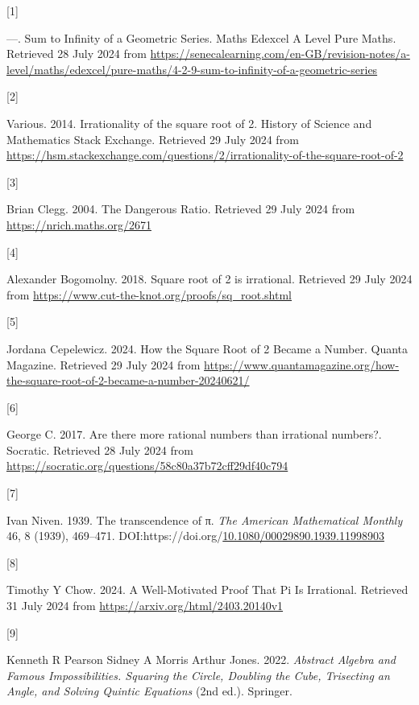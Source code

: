 \documentclass[
  a4paper,
]{article}
\newlength{\cslhangindent}
\newlength{\csllabelwidth}
\newenvironment{CSLReferences}[2] %
 {\begin{list}{}{%
  \setlength{\itemindent}{0pt}
  \setlength{\leftmargin}{0pt}
  \setlength{\parsep}{0pt}
  \ifodd #1
   \setlength{\leftmargin}{\cslhangindent}
   \setlength{\itemindent}{-1\cslhangindent}
  \fi
  \setlength{\itemsep}{#2\baselineskip}}}
 {\end{list}}
\newcommand{\CSLLeftMargin}[1]{\parbox[t]{\csllabelwidth}{\strut#1\strut}}
\newcommand{\CSLRightInline}[1]{\parbox[t]{\linewidth - \csllabelwidth}{\strut#1\strut}}
\begin{document}
\label{refs}
\begin{CSLReferences}{0}{0}
\CSLLeftMargin{{[}1{]} }%
\CSLRightInline{---. {Sum to Infinity of a Geometric Series}. {Maths
Edexcel A Level Pure Maths}. Retrieved 28 July 2024 from
\url{https://senecalearning.com/en-GB/revision-notes/a-level/maths/edexcel/pure-maths/4-2-9-sum-to-infinity-of-a-geometric-series}}

\CSLLeftMargin{{[}2{]} }%
\CSLRightInline{Various. 2014. {Irrationality of the square root of 2}.
{History of Science and Mathematics Stack Exchange}. Retrieved 29 July
2024 from
\url{https://hsm.stackexchange.com/questions/2/irrationality-of-the-square-root-of-2}}

\CSLLeftMargin{{[}3{]} }%
\CSLRightInline{Brian Clegg. 2004. {The Dangerous Ratio}. Retrieved 29
July 2024 from \url{https://nrich.maths.org/2671}}

\CSLLeftMargin{{[}4{]} }%
\CSLRightInline{Alexander Bogomolny. 2018. {Square root of 2 is
irrational}. Retrieved 29 July 2024 from
\url{https://www.cut-the-knot.org/proofs/sq_root.shtml}}

\CSLLeftMargin{{[}5{]} }%
\CSLRightInline{Jordana Cepelewicz. 2024. {How the Square Root of 2
Became a Number}. {Quanta Magazine}. Retrieved 29 July 2024 from
\url{https://www.quantamagazine.org/how-the-square-root-of-2-became-a-number-20240621/}}

\CSLLeftMargin{{[}6{]} }%
\CSLRightInline{George C. 2017. {Are there more rational numbers than
irrational numbers?}. {Socratic}. Retrieved 28 July 2024 from
\url{https://socratic.org/questions/58c80a37b72cff29df40c794}}

\CSLLeftMargin{{[}7{]} }%
\CSLRightInline{Ivan Niven. 1939. The transcendence of π. \emph{{The
American Mathematical Monthly}} 46, 8 (1939), 469--471.
DOI:https://doi.org/\href{https://doi.org/10.1080/00029890.1939.11998903}{10.1080/00029890.1939.11998903}}

\CSLLeftMargin{{[}8{]} }%
\CSLRightInline{Timothy Y Chow. 2024. {A Well-Motivated Proof That Pi Is
Irrational}. Retrieved 31 July 2024 from
\url{https://arxiv.org/html/2403.20140v1}}

\CSLLeftMargin{{[}9{]} }%
\CSLRightInline{Kenneth R Pearson Sidney A Morris Arthur Jones. 2022.
\emph{{Abstract Algebra and Famous Impossibilities}. {Squaring the
Circle, Doubling the Cube, Trisecting an Angle, and Solving Quintic
Equations}} (2nd ed.). Springer.}


\end{CSLReferences}
\end{document}
